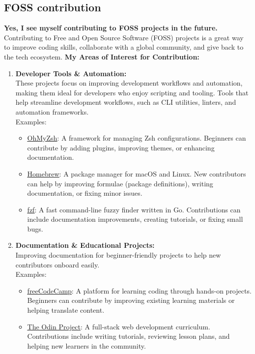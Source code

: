 \documentclass[titlepage]{article}
\begin{document}
\subsection{FOSS contribution}
\textbf{Yes, I see myself contributing to FOSS projects in the future.}
\\Contributing to Free and Open Source Software (FOSS) projects is a great way to improve coding skills, collaborate with a global community, and give back to the tech ecosystem.  
\textbf{My Areas of Interest for Contribution:}
\begin{enumerate}
\item \textbf{Developer Tools \& Automation:}  
\\These projects focus on improving development workflows and automation, making them ideal for developers who enjoy scripting and tooling. Tools that help streamline development workflows, such as CLI utilities, linters, and automation frameworks.  
\\Examples: 
\begin{itemize}
  \item \href{https://github.com/ohmyzsh/ohmyzsh}{\underline{OhMyZsh}}: A framework for managing Zsh configurations. Beginners can contribute by adding plugins, improving themes, or enhancing documentation.
  \item \href{https://github.com/Homebrew/brew}{\underline{Homebrew}}: A package manager for macOS and Linux. New contributors can help by improving formulae (package definitions), writing documentation, or fixing minor issues.
  \item \href{https://github.com/junegunn/fzf}{\underline{fzf}}: A fast command-line fuzzy finder written in Go. Contributions can include documentation improvements, creating tutorials, or fixing small bugs.
\end{itemize}
\item \textbf{Documentation \& Educational Projects:}
\\Improving documentation for beginner-friendly projects to help new contributors onboard easily.  
\\Examples:
\begin{itemize}
  \item \href{https://github.com/freeCodeCamp/freeCodeCamp}{\underline{freeCodeCamp}}: A platform for learning coding through hands-on projects. Beginners can contribute by improving existing learning materials or helping translate content.
  \item \href{https://github.com/TheOdinProject}{\underline{The Odin Project}}: A full-stack web development curriculum. Contributions include writing tutorials, reviewing lesson plans, and helping new learners in the community.

\end{itemize}
\end{enumerate}
\end{document}
